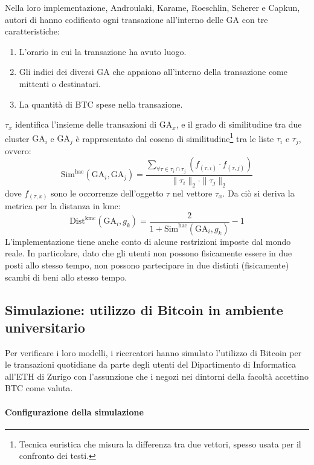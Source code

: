 Nella loro implementazione, Androulaki, Karame, Roeschlin, Scherer e Capkun, autori di \cite{user-privacy} hanno codificato ogni transazione all'interno delle GA con tre caratteristiche:
\begin{enumerate}
    \item
        L'orario in cui la transazione ha avuto luogo.
    \item
        Gli indici dei diversi GA che appaiono all'interno della transazione come mittenti o destinatari.
    \item
        La quantità di BTC spese nella transazione.
\end{enumerate}
$\tau_x$ identifica l'insieme delle transazioni di $\text{GA}_x$, e il grado di similitudine tra due cluster $\text{GA}_i$ e $\text{GA}_j$ è rappresentato dal coseno di similitudine\footnote{Tecnica euristica che misura la differenza tra due vettori, spesso usata per il confronto dei testi.} tra le liste $\tau_i$ e $\tau_j$, ovvero:
\[
\text{Sim}^\text{hac} \left( \text{GA}_i , \text{GA}_j \right) = \frac{\sum_{\forall \tau \in \tau_i \cap \tau_j} \left( f_{\left( \tau, i \right)} \cdot f_{\left( \tau, j \right)} \right) }{ \| \tau_i \|_2 \cdot \| \tau_j \|_2 }
\]
dove $f_{\left( \tau, x \right)}$ sono le occorrenze dell'oggetto $\tau$ nel vettore $\tau_x$.
Da ciò si deriva la metrica per la distanza in \gls{kmc}:
\[
\text{Dist}^\text{kmc} \left( \text{GA}_i , g_k \right) = \frac{2}{ 1 + \text{Sim}^\text{hac} \left( \text{GA}_i , g_k \right) } - 1
\]
L'implementazione tiene anche conto di alcune restrizioni imposte dal mondo reale. In particolare, dato che gli utenti non possono fisicamente essere in due posti allo stesso tempo, non possono partecipare in due distinti (fisicamente) scambi di beni allo stesso tempo.

\subsection{Simulazione: utilizzo di Bitcoin in ambiente universitario}\label{utilizzo-simulatore-privacy-utente}

Per verificare i loro modelli, i ricercatori hanno simulato l'utilizzo di Bitcoin per le transazioni quotidiane da parte degli utenti del Dipartimento di Informatica all'ETH di Zurigo con l'assunzione che i negozi nei dintorni della facoltà accettino BTC come valuta.

\paragraph{Configurazione della simulazione}

